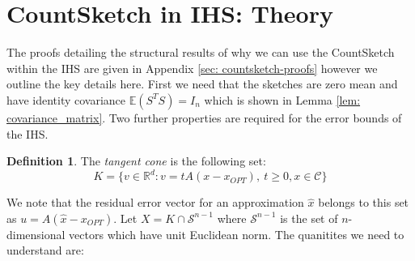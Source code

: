 \documentclass[twoside]{article}
\newcommand{\R}{\mathbb{R}}
\newcommand{\E}{\mathbb{E}}
\theoremstyle{definition}\newtheorem{thm}{Theorem}[section]
\theoremstyle{definition}\newtheorem{mydef}[thm]{Definition}
\theoremstyle{definition}\newtheorem{rem}[thm]{Remark}
\theoremstyle{definition}\newtheorem{prop}[thm]{Proposition}
\theoremstyle{definition}\newtheorem{example}[thm]{Example}
\theoremstyle{definition}\newtheorem{claim}[thm]{Claim}
\theoremstyle{definition}\newtheorem{Qu}[thm]{Question}
\theoremstyle{definition}\newtheorem{Lemma}[thm]{Lemma}
\theoremstyle{definition}\newtheorem{Cor}[thm]{Corollary}
\theoremstyle{definition}\newtheorem{Fact}[]{Fact}
\begin{document}
\section{CountSketch in IHS: Theory}
The proofs detailing the structural results of why we can use the CountSketch
within the IHS are given in Appendix \ref{sec: countsketch-proofs} however we
outline the key details here.
First we need that the sketches are zero mean and have identity covariance
$\E(S^TS) = I_{n}$ which is shown in Lemma \ref{lem: covariance_matrix}.
Two further properties are required for the error bounds of the IHS.

\begin{mydef}
  The \textit{tangent cone} is the following set:
  \begin{equation}
    K = \{ v \in \R^d : v = tA(x-x_{OPT}), ~ t \ge 0, x \in \mathcal{C}\}
  \end{equation}
\end{mydef}
\noindent We note that the residual error vector for an approximation $\hat{x}$
belongs to this set as $u=A(\hat{x} - x_{OPT})$.
Let $X = K \cap \mathcal{S}^{n-1}$ where $\mathcal{S}^{n-1}$ is the set of $n$-
dimensional vectors which have unit Euclidean norm.
The quanitites we need to understand are:
\end{document}
